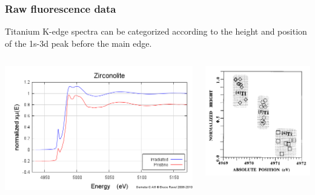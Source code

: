 \documentclass[10pt, xcolor=x11names, compress, handout]{beamer}
\begin{document}
\begin{frame}
  \frametitle{Raw fluorescence data}

  Titanium K-edge spectra can be categorized according to the height
  and position of the 1s-3d peak before the main edge.

  \begin{columns}
    \begin{column}{0.5\linewidth}
      \includegraphics[width=\linewidth]{images/pristine_irrad.png}
    \end{column}
    \begin{column}{0.5\linewidth}
      \begin{center}
        \includegraphics[width=0.8\linewidth]{images/farges.png}
      \end{center}
    \end{column}
  \end{columns}


\end{frame}
\end{document}
